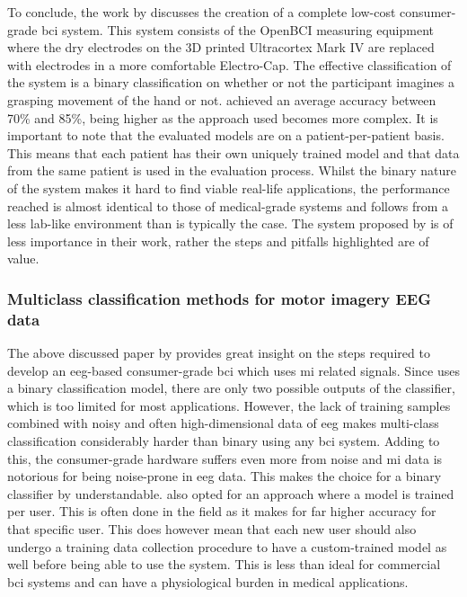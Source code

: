To conclude, the work by  discusses the creation of a complete low-cost consumer-grade \gls{bci} system.
This system consists of the OpenBCI measuring equipment where the dry electrodes on the 3D printed Ultracortex Mark IV are replaced with electrodes in a more comfortable Electro-Cap.
The effective classification of the system is a binary  classification on whether or not the participant imagines a grasping movement of the hand or not.
 achieved an average accuracy between 70\% and 85\%, being higher as the approach used becomes more complex.
It is important to note that the evaluated models are on a patient-per-patient basis.
This means that each patient has their own uniquely trained model and that data from the same patient is used in the evaluation process.
Whilst the binary nature of the system makes it hard to find viable real-life applications, the performance reached is almost identical to those of medical-grade systems and follows from a less lab-like environment than is typically the case.
The system proposed by  is of less importance in their work, rather the steps and pitfalls highlighted are of value.




\subsubsection{Multiclass classification methods for motor imagery EEG data}
\label{subsubsec:bci_opportunities_obstacles_motivating_examples_mi_classification}

The above discussed paper by \citet{cheap_bci_feasibility} provides great insight on the steps required to develop an \gls{eeg}-based consumer-grade \gls{bci} which uses \gls{mi} related signals.
Since \citet{cheap_bci_feasibility} uses a binary classification model, there are only two possible outputs of the classifier, which is too limited for most applications.
However, the lack of training samples combined with noisy and often high-dimensional data of \gls{eeg} makes multi-class classification considerably harder than binary using any \gls{bci} system.
Adding to this, the consumer-grade hardware suffers even more from noise and \gls{mi} data is notorious for being noise-prone in \gls{eeg} data.
This makes the choice for a binary classifier by  understandable.
 also opted for an approach where a model is trained per user.
This is often done in the field as it makes for far higher accuracy for that specific user.
This does however mean that each new user should also undergo a training data collection procedure to have a custom-trained model as well before being able to use the system.
This is less than ideal for commercial \gls{bci} systems and can have a physiological burden in medical applications.

